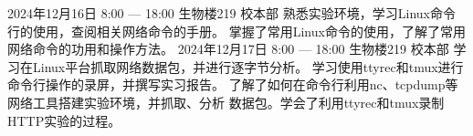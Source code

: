 \documentclass{swfulabjournal}
\begin{document}
\maketitle %

\addjournal%
{2024年12月16日}%
{8:00 --- 18:00}%
{生物楼219}%
{校本部}%
{%
  熟悉实验环境，学习Linux命令行的使用，查阅相关网络命令的手册。}%
{%
  掌握了常用Linux命令的使用，了解了常用网络命令的功用和操作方法。}%
\clearpage
\addjournal%
{2024年12月17日}%
{8:00 --- 18:00}%
{生物楼219}%
{校本部}%
{%
  学习在Linux平台抓取网络数据包，并进行逐字节分析。
  学习使用ttyrec和tmux进行命令行操作的录屏，并撰写实习报告。}%
{%
  了解了如何在命令行利用nc、tcpdump等网络工具搭建实验环境，并抓取、分析
  数据包。学会了利用ttyrec和tmux录制HTTP实验的过程。}%
\end{document}

